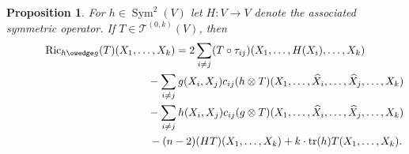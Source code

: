 \documentclass[10pt,a4paper]{amsart}
\numberwithin{equation}{section}
\newtheorem{Proposition}[Theorem]{Proposition}
{ \theoremstyle{definition}
\newtheorem{Remark}[Theorem]{Remark} }
\newcommand{\Ric} {\operatorname{Ric}}
\newcommand{ \tr } {\operatorname{tr}}
\newcommand{ \Sym } {\operatorname{Sym}}
\begin{document}
\begin{Proposition}\label{GeneralFormulaBochnerOnHWedgeG}
For $h \in \Sym^2(V)$ let $H \colon V \to V$ denote the associated symmetric operator. If $T \in \mathcal{T}^{(0,k)}(V)$, then
\begin{gather*}
\Ric_{h \owedge g}(T) (X_1, \dots, X_k)
=   2 \sum_{i \neq j} ( T \circ \tau_{ij}) (X_1, \dots, H(X_i), \dots, X_k) \\
\hphantom{\Ric_{h \owedge g}(T) (X_1, \dots, X_k)=}{}
 - \sum_{i \neq j} g(X_i, X_j) c_{ij}(h \otimes T)( X_1, \dots, \widehat{X}_i, \dots, \widehat{X}_j, \dots, X_k ) \\
\hphantom{\Ric_{h \owedge g}(T) (X_1, \dots, X_k)=}{} - \sum_{i \neq j} h(X_i, X_j) c_{ij}(g \otimes T)( X_1, \dots, \widehat{X}_i, \dots, \widehat{X}_j, \dots, X_k ) \\
\hphantom{\Ric_{h \owedge g}(T) (X_1, \dots, X_k)=}{} -(n-2) (HT)(X_1, \dots, X_k) + k \cdot \tr(h) T( X_1, \dots, X_k).
\end{gather*}
\end{Proposition}
\end{document}
